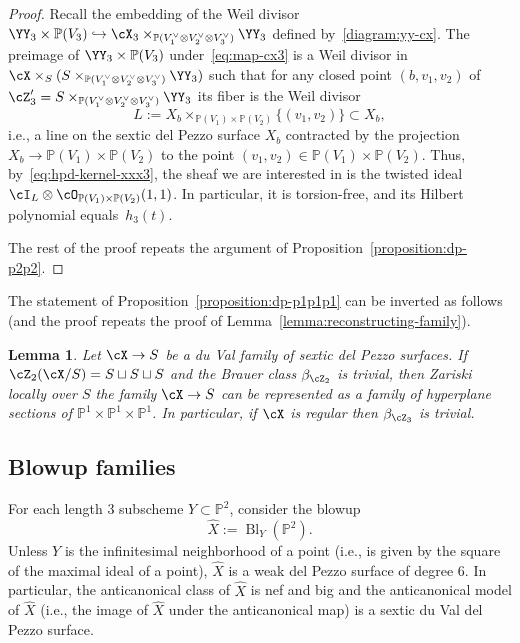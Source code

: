 \documentclass[11pt]{amsart}
\renewcommand{\P}{{\mathbb{P}}}
\DeclareMathOperator{\Bl}{\mathrm{Bl}}
\theoremstyle{plain}
\newtheorem{lemma}[theorem]{Lemma}
\theoremstyle{definition}
\theoremstyle{remark}
\begin{document}
\begin{proof}
Recall the embedding of the Weil divisor $\YY_3 \times \P(V_3) \hookrightarrow \cX_3 \times_{\P(V_1^\vee \otimes V_2^\vee \otimes V_3^\vee)} \YY_3$ defined by~\eqref{diagram:yy-cx}.
The preimage of $\YY_3 \times \P(V_3)$ under~\eqref{eq:map-cx3} is a Weil divisor in $\cX \times_S (S \times_{\P(V_1^\vee \otimes V_2^\vee \otimes V_3^\vee)} \YY_3)$ 
such that for any closed point $(b,v_1,v_2)$ of $\cZ'_3 = S \times_{\P(V_1^\vee \otimes V_2^\vee \otimes V_3^\vee)} \YY_3$ its fiber is the Weil divisor 
\begin{equation*}
L := X_b \times_{\P(V_1) \times \P(V_2)} \{(v_1,v_2)\} \subset X_b,
\end{equation*}
i.e., a line on the sextic del Pezzo surface $X_b$ contracted by the projection $X_b \to \P(V_1) \times \P(V_2)$ 
to the point $(v_1,v_2) \in \P(V_1) \times \P(V_2)$.
Thus, by~\eqref{eq:hpd-kernel-xxx3}, the sheaf we are interested in is the twisted ideal \mbox{$\cI_L \otimes \cO_{\P(V_1) \times \P(V_2)}(1,1)$}.
In particular, it is torsion-free, and its Hilbert polynomial equals~$h_3(t)$.

The rest of the proof repeats the argument of Proposition~\ref{proposition:dp-p2p2}.
\end{proof}

The statement of Proposition~\ref{proposition:dp-p1p1p1} can be inverted as follows (and the proof repeats the proof of Lemma~\ref{lemma:reconstructing-family}).

\begin{lemma}
Let $\cX \to S$ be a du Val family of sextic del Pezzo surfaces.
If $\cZ_2(\cX/S) = S \sqcup S \sqcup S$ and the Brauer class $\beta_{\cZ_2}$ is trivial, then Zariski locally over $S$ 
the family $\cX \to S$ can be represented as a family of hyperplane sections of\/ $\P^1 \times \P^1 \times \P^1$.
In particular, if $\cX$ is regular then $\beta_{\cZ_3}$ is trivial.
\end{lemma}


\subsection{Blowup families}\label{subsection:blowups}

For each length 3 subscheme $Y \subset \P^2$, consider the blowup 
\begin{equation*}
\widehat{X} := \Bl_Y(\P^2).
\end{equation*}
Unless $Y$ is the infinitesimal neighborhood of a point (i.e., is given by the square of the maximal ideal of a point), 
$\widehat{X}$ is a weak del Pezzo surface of degree 6.
In particular, the anticanonical class of $\widehat{X}$ is nef and big and
the anticanonical model of $\widehat{X}$ (i.e., the image of $\widehat{X}$ under the anticanonical map) is a sextic du Val del Pezzo surface.
\end{document}

